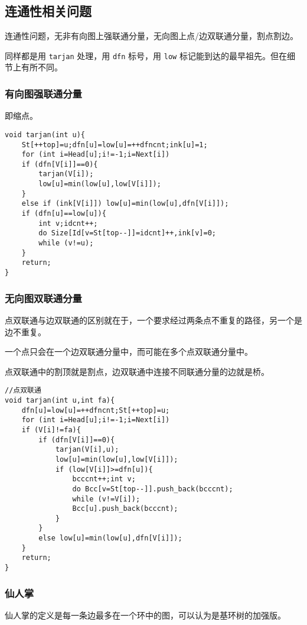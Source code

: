 \documentclass[UTF-8]{ctexart}
\begin{document}
	\subsection{连通性相关问题}
	连通性问题，无非有向图上强联通分量，无向图上点/边双联通分量，割点割边。
	
	同样都是用 \texttt{tarjan} 处理，用 \texttt{dfn} 标号，用 \texttt{low} 标记能到达的最早祖先。但在细节上有所不同。
	
	\subsubsection{有向图强联通分量}
	即缩点。
\begin{verbatim}
void tarjan(int u){
    St[++top]=u;dfn[u]=low[u]=++dfncnt;ink[u]=1;
    for (int i=Head[u];i!=-1;i=Next[i])
    if (dfn[V[i]]==0){
        tarjan(V[i]);
        low[u]=min(low[u],low[V[i]]);
    }
    else if (ink[V[i]]) low[u]=min(low[u],dfn[V[i]]);
    if (dfn[u]==low[u]){
        int v;idcnt++;
        do Size[Id[v=St[top--]]=idcnt]++,ink[v]=0;
        while (v!=u);
    }
    return;
}
\end{verbatim}
	\subsubsection{无向图双联通分量}
	点双联通与边双联通的区别就在于，一个要求经过两条点不重复的路径，另一个是边不重复。
	
	一个点只会在一个边双联通分量中，而可能在多个点双联通分量中。
	
	点双联通中的割顶就是割点，边双联通中连接不同联通分量的边就是桥。
\begin{verbatim}
//点双联通
void tarjan(int u,int fa){
    dfn[u]=low[u]=++dfncnt;St[++top]=u;
    for (int i=Head[u];i!=-1;i=Next[i])
    if (V[i]!=fa){
        if (dfn[V[i]]==0){
            tarjan(V[i],u);
            low[u]=min(low[u],low[V[i]]);
            if (low[V[i]]>=dfn[u]){
                bcccnt++;int v;
                do Bcc[v=St[top--]].push_back(bcccnt);
                while (v!=V[i]);
                Bcc[u].push_back(bcccnt);
            }
        }
        else low[u]=min(low[u],dfn[V[i]]);
    }
    return;
}
\end{verbatim}
	\subsubsection{仙人掌}
	仙人掌的定义是每一条边最多在一个环中的图，可以认为是基环树的加强版。
	
\end{document}
